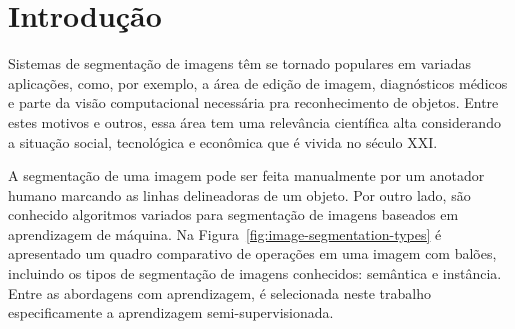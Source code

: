 \chapter{Introdução}\label{cap:introducao}

Sistemas de segmentação de imagens têm se tornado populares em
variadas aplicações, como, por exemplo, a área de edição de imagem,
diagnósticos médicos e parte da visão computacional necessária pra
reconhecimento de objetos. Entre estes motivos e outros, essa área tem
uma relevância científica alta considerando a situação social,
tecnológica e econômica que é vivida no século XXI.\@

A segmentação de uma imagem pode ser feita manualmente por um anotador
humano marcando as linhas delineadoras de um objeto. Por outro lado,
são conhecido algoritmos variados para segmentação de imagens baseados
em aprendizagem de máquina. Na Figura~\ref{fig:image-segmentation-types}
é apresentado um quadro comparativo de operações em uma imagem com
balões, incluindo os tipos de segmentação de imagens conhecidos:
semântica e instância. Entre as abordagens com aprendizagem, é
selecionada neste trabalho especificamente a aprendizagem
semi-supervisionada.

\begin{figure}[h!]
        \captionsetup{width=16cm}
		\centering
\end{figure}


